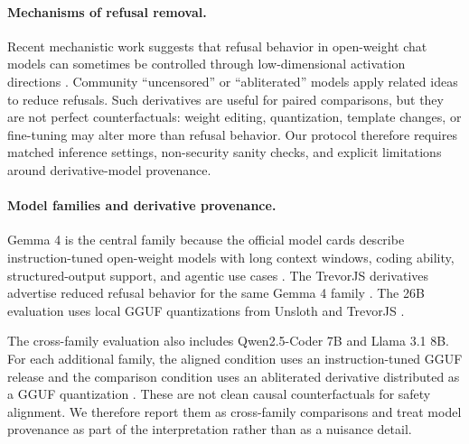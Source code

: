 \paragraph{Mechanisms of refusal removal.}
Recent mechanistic work suggests that refusal behavior in open-weight chat
models can sometimes be controlled through low-dimensional activation
directions \cite{arditi2024refusal}. Community ``uncensored'' or
``abliterated'' models apply related ideas to reduce refusals. Such derivatives
are useful for paired comparisons, but they are not perfect counterfactuals: weight
editing, quantization, template changes, or fine-tuning may alter more than
refusal behavior. Our protocol therefore requires matched inference settings,
non-security sanity checks, and explicit limitations around derivative-model
provenance.

\paragraph{Model families and derivative provenance.}
Gemma 4 is the central family because the official model cards describe
instruction-tuned open-weight models with long context windows, coding ability,
structured-output support, and agentic use cases
\cite{google_gemma4_blog_2026,hf_gemma4_31b_it,hf_gemma4_26b_a4b_it}. The
TrevorJS derivatives advertise reduced refusal behavior for the same Gemma 4
family \cite{trevorjs_gemma4_uncensored_collection,
trevorjs_gemma4_31b_uncensored,trevorjs_gemma4_26b_uncensored}. The 26B
evaluation uses local GGUF quantizations from Unsloth and TrevorJS
\cite{unsloth_gemma4_26b_a4b_gguf,trevorjs_gemma4_26b_uncensored_gguf}.

The cross-family evaluation also includes Qwen2.5-Coder 7B and Llama 3.1 8B.
For each additional family, the aligned condition uses an instruction-tuned
GGUF release and the comparison condition uses an abliterated derivative
distributed as a GGUF quantization
\cite{qwen25coder7b_gguf,qwen25coder7b_abliterated_gguf,
llama31_8b_instruct_gguf,llama31_8b_abliterated_gguf}. These are not clean
causal counterfactuals for safety alignment. We therefore report them as
cross-family comparisons and treat model provenance as part of the
interpretation rather than as a nuisance detail.

